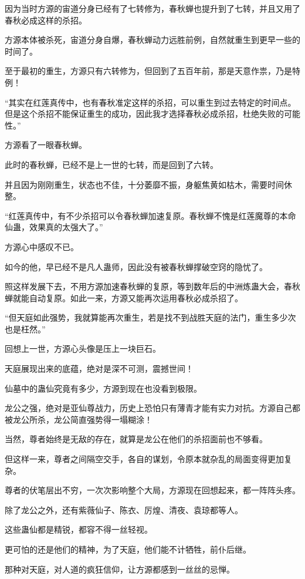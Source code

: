 \begin{this_body}
因为当时方源的宙道分身已经有了七转修为，春秋蝉也提升到了七转，并且又用了春秋必成这样的杀招。

方源本体被杀死，宙道分身自爆，春秋蝉动力远胜前例，自然就重生到更早一些的时间了。

至于最初的重生，方源只有六转修为，但回到了五百年前，那是天意作祟，乃是特例！

“其实在红莲真传中，也有春秋准定这样的杀招，可以重生到过去特定的时间点。但是这个杀招不能保证重生的成功，因此我才选择春秋必成杀招，杜绝失败的可能性。”

方源看了一眼春秋蝉。

此时的春秋蝉，已经不是上一世的七转，而是回到了六转。

并且因为刚刚重生，状态也不佳，十分萎靡不振，身躯焦黄如枯木，需要时间休整。

“红莲真传中，有不少杀招可以令春秋蝉加速复原。春秋蝉不愧是红莲魔尊的本命仙蛊，效果真的太强大了。”

方源心中感叹不已。

如今的他，早已经不是凡人蛊师，因此没有被春秋蝉撑破空窍的隐忧了。

照这样发展下去，不用方源加速春秋蝉的复原，等到数年后的中洲炼蛊大会，春秋蝉就能自动复原。如此一来，方源又能再次运用春秋必成杀招了。

“但天庭如此强势，我就算能再次重生，若是找不到战胜天庭的法门，重生多少次也是枉然。”

回想上一世，方源心头像是压上一块巨石。

天庭展现出来的底蕴，绝对是深不可测，震撼世间！

仙墓中的蛊仙究竟有多少，方源到现在也没看到极限。

龙公之强，绝对是亚仙尊战力，历史上恐怕只有薄青才能有实力对抗。方源自己都被龙公所杀，龙公简直强势得一塌糊涂！

当然，尊者始终是无敌的存在，就算是龙公在他们的杀招面前也不够看。

但这样一来，尊者之间隔空交手，各自的谋划，令原本就杂乱的局面变得更加复杂。

尊者的伏笔层出不穷，一次次影响整个大局，方源现在回想起来，都一阵阵头疼。

除了龙公之外，还有紫薇仙子、陈衣、厉煌、清夜、袁琼都等人。

这些蛊仙都是精锐，都容不得一丝轻视。

更可怕的还是他们的精神，为了天庭，他们能不计牺牲，前仆后继。

那种对天庭，对人道的疯狂信仰，让方源都感到一丝丝的忌惮。


\end{this_body}
